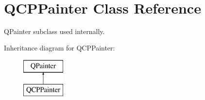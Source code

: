 \hypertarget{classQCPPainter}{\section{Q\-C\-P\-Painter Class Reference}
\label{classQCPPainter}
}


Q\-Painter subclass used internally.  


Inheritance diagram for Q\-C\-P\-Painter\-:\begin{figure}[H]
\begin{center}
\leavevmode
\includegraphics[height=2.000000cm]{classQCPPainter}
\end{center}
\end{figure}
